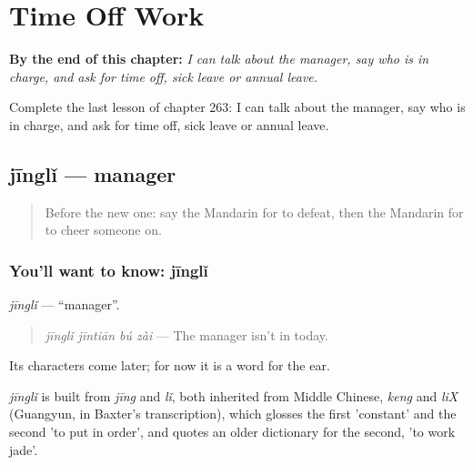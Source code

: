 
\chapter{Time Off Work}
\label{ch:zh-time-off-work}

\begin{chapteropening}
\textbf{By the end of this chapter:} \emph{I can talk about the manager, say who is in charge, and ask for time off, sick leave or annual leave.}

Complete the last lesson of chapter 263: I can talk about the manager, say who is in charge, and ask for time off, sick leave or annual leave.
\end{chapteropening}

\section[jīnglǐ]{jīnglǐ — manager}

\label{lesson:ZH-C263-jingli}



\begin{quote}
Before the new one: say the Mandarin for to defeat, then the Mandarin for to cheer someone on.
\end{quote}

\subsection*{You'll want to know: jīnglǐ}
\emph{jīnglǐ} — \textquotedblleft{}manager\textquotedblright{}.

\begin{quote}
\emph{jīnglǐ jīntiān bú zài} — The manager isn't in today.
\end{quote}

Its characters come later; for now it is a word for the ear.

\begin{cousinweb}
\emph{jīnglǐ} is built from \emph{jīng} and \emph{lǐ}, both inherited from Middle Chinese, \emph{keng} and \emph{liX} (Guangyun, in Baxter's transcription), which glosses the first 'constant' and the second 'to put in order', and quotes an older dictionary for the second, 'to work jade'.
\end{cousinweb}

